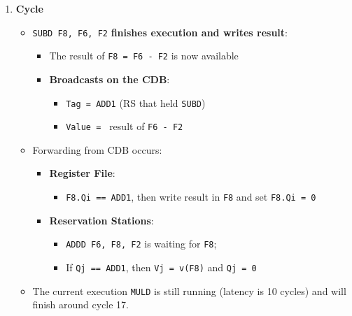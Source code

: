 \begin{enumerate}
    \item \textbf{Cycle \theenumi}
    \begin{itemize}
        \item \texttt{SUBD F8, F6, F2} \textbf{finishes execution and writes result}:
        \begin{itemize}
            \item The result of \texttt{F8 = F6 - F2} is now available
            \item \textbf{Broadcasts on the CDB}:
            \begin{itemize}
                \item \texttt{Tag = ADD1} (RS that held \texttt{SUBD})
                \item \texttt{Value = } result of \texttt{F6 - F2}
            \end{itemize}
        \end{itemize}
        \item Forwarding from CDB occurs:
        \begin{itemize}
            \item \textbf{Register File}:
            \begin{itemize}
                \item \texttt{F8.Qi == ADD1}, then write result in \texttt{F8} and set \texttt{F8.Qi = 0}
            \end{itemize}
            \item \textbf{Reservation Stations}:
            \begin{itemize}
                \item \texttt{ADDD F6, F8, F2} is waiting for \texttt{F8};
                \item If \texttt{Qj == ADD1}, then \texttt{Vj = v(F8)} and \texttt{Qj = 0}
            \end{itemize}
        \end{itemize}
        \item The current execution \texttt{MULD} is still running (latency is 10 cycles) and will finish around cycle 17.
    \end{itemize}


\end{enumerate}
